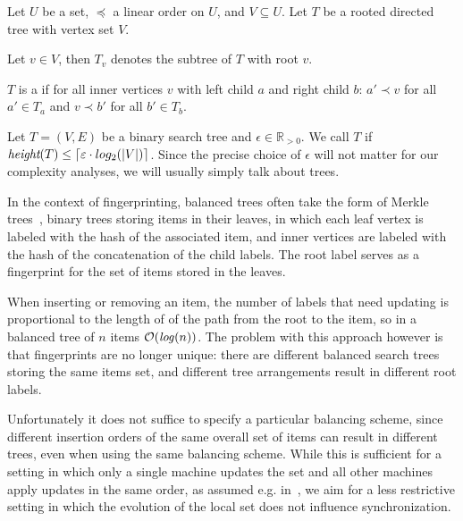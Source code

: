 \begin{definition}
Let $U$ be a set, $\preceq$ a linear order on $U$, and $V \subseteq U$. Let $T$ be a rooted directed tree with vertex set $V$.

Let $v \in V$, then $T_v$ denotes the subtree of $T$ with root $v$.

$T$ is a  if for all inner vertices $v$ with left child $a$ and right child $b$: $a' \prec v$ for all $a' \in T_a$ and $v \prec b'$ for all $b' \in T_b$.

\end{definition}

\begin{definition}
Let $T = (V, E)$ be a binary search tree and $\epsilon \in \mathbb{R}_{> 0}$.
We call $T$  if $\textit{height}(T) \leq \ceil*{\epsilon \cdot log_2(|V|)}$.
Since the precise choice of $\epsilon$ will not matter for our complexity analyses, we will usually simply talk about  trees.
\end{definition}

In the context of fingerprinting, balanced trees often take the form of Merkle trees~\cite{merkle1989certified}, binary trees storing items in their leaves, in which each leaf vertex is labeled with the hash of the associated item, and inner vertices are labeled with the hash of the concatenation of the child labels. The root label serves as a fingerprint for the set of items stored in the leaves.

When inserting or removing an item, the number of labels that need updating is proportional to the length of of the path from the root to the item, so in a balanced tree of $n$ items $\complexity{\mathit{log}(n)}$. The problem with this approach however is that fingerprints are no longer unique: there are different balanced search trees storing the same items set, and different tree arrangements result in different root labels.

Unfortunately it does not suffice to specify a particular balancing scheme, since different insertion orders of the same overall set of items can result in different trees, even when using the same balancing scheme. While this is sufficient for a setting in which only a single machine updates the set and all other machines apply updates in the same order, as assumed e.g. in~\cite{naor2000certificate}, we aim for a less restrictive setting in which the evolution of the local set does not influence synchronization.


